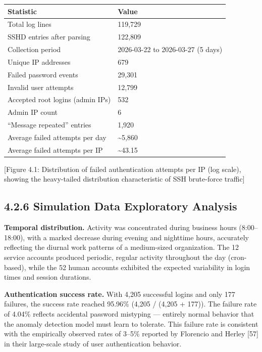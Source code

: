 \documentclass[
  a4paper]{report}
\newcounter{none} %
\begin{document}
{\def\LTcaptype{none} %
\begin{longtable}[]{@{}ll@{}}
\toprule\noalign{}
Statistic & Value \\
\midrule\noalign{}
\endhead
\bottomrule\noalign{}
\endlastfoot
Total log lines & 119,729 \\
SSHD entries after parsing & 122,809 \\
Collection period & 2026-03-22 to 2026-03-27 (5 days) \\
Unique IP addresses & 679 \\
Failed password events & 29,301 \\
Invalid user attempts & 12,799 \\
Accepted root logins (admin IPs) & 532 \\
Admin IP count & 6 \\
``Message repeated'' entries & 1,920 \\
Average failed attempts per day & \textasciitilde5,860 \\
Average failed attempts per IP & \textasciitilde43.15 \\
\end{longtable}
}

{[}Figure 4.1: Distribution of failed authentication attempts per IP
(log scale), showing the heavy-tailed distribution characteristic of SSH
brute-force traffic{]}

\subsection{4.2.6 Simulation Data Exploratory
Analysis}\label{simulation-data-exploratory-analysis}

\textbf{Temporal distribution.} Activity was concentrated during
business hours (8:00--18:00), with a marked decrease during evening and
nighttime hours, accurately reflecting the diurnal work patterns of a
medium-sized organization. The 12 service accounts produced periodic,
regular activity throughout the day (cron-based), while the 52 human
accounts exhibited the expected variability in login times and session
durations.

\textbf{Authentication success rate.} With 4,205 successful logins and
only 177 failures, the success rate reached 95.96\% (4,205 / (4,205 +
177)). The failure rate of 4.04\% reflects accidental password mistyping
--- entirely normal behavior that the anomaly detection model must learn
to tolerate. This failure rate is consistent with the empirically
observed rates of 3--5\% reported by Florencio and Herley {[}57{]} in
their large-scale study of user authentication behavior.
\end{document}
